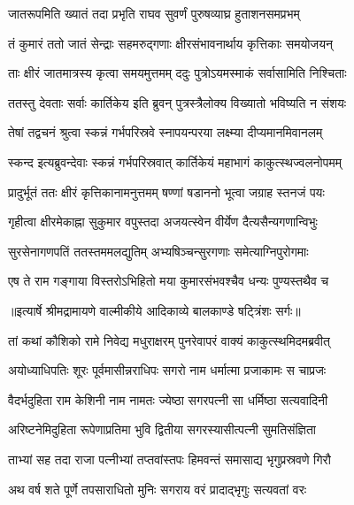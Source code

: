 \twolineshloka
{जातरूपमिति ख्यातं तदा प्रभृति राघव}
{सुवर्णं पुरुषव्याघ्र हुताशनसमप्रभम्} %

\twolineshloka
{तं कुमारं ततो जातं सेन्द्राः सहमरुद्गणाः}
{क्षीरसंभावनार्थाय कृत्तिकाः समयोजयन्} %

\twolineshloka
{ताः क्षीरं जातमात्रस्य कृत्वा समयमुत्तमम्}
{ददुः पुत्रोऽयमस्माकं सर्वासामिति निश्चिताः} %

\twolineshloka
{ततस्तु देवताः सर्वाः कार्तिकेय इति ब्रुवन्}
{पुत्रस्त्रैलोक्य विख्यातो भविष्यति न संशयः} %

\twolineshloka
{तेषां तद्वचनं श्रुत्वा स्कन्नं गर्भपरिस्रवे}
{स्नापयन्परया लक्ष्म्या दीप्यमानमिवानलम्} %

\twolineshloka
{स्कन्द इत्यब्रुवन्देवाः स्कन्नं गर्भपरिस्रवात्}
{कार्तिकेयं महाभागं काकुत्स्थज्वलनोपमम्} %

\twolineshloka
{प्रादुर्भूतं ततः क्षीरं कृत्तिकानामनुत्तमम्}
{षण्णां षडाननो भूत्वा जग्राह स्तनजं पयः} %

\twolineshloka
{गृहीत्वा क्षीरमेकाह्ना सुकुमार वपुस्तदा}
{अजयत्स्वेन वीर्येण दैत्यसैन्यगणान्विभुः} %

\twolineshloka
{सुरसेनागणपतिं ततस्तममलद्युतिम्}
{अभ्यषिञ्चन्सुरगणाः समेत्याग्निपुरोगमाः} %

\twolineshloka
{एष ते राम गङ्गाया विस्तरोऽभिहितो मया}
{कुमारसंभवश्चैव धन्यः पुण्यस्तथैव च} %


{॥इत्यार्षे श्रीमद्रामायणे वाल्मीकीये आदिकाव्ये बालकाण्डे षट्त्रिंशः सर्गः॥}


\twolineshloka
{तां कथां कौशिको रामे निवेद्य मधुराक्षरम्}
{पुनरेवापरं वाक्यं काकुत्स्थमिदमब्रवीत्} %

\twolineshloka
{अयोध्याधिपतिः शूरः पूर्वमासीन्नराधिपः}
{सगरो नाम धर्मात्मा प्रजाकामः स चाप्रजः} %

\twolineshloka
{वैदर्भदुहिता राम केशिनी नाम नामतः}
{ज्येष्ठा सगरपत्नी सा धर्मिष्ठा सत्यवादिनी} %

\twolineshloka
{अरिष्टनेमिदुहिता रूपेणाप्रतिमा भुवि}
{द्वितीया सगरस्यासीत्पत्नी सुमतिसंज्ञिता} %

\twolineshloka
{ताभ्यां सह तदा राजा पत्नीभ्यां तप्तवांस्तपः}
{हिमवन्तं समासाद्य भृगुप्रस्रवणे गिरौ} %

\twolineshloka
{अथ वर्ष शते पूर्णे तपसाराधितो मुनिः}
{सगराय वरं प्रादाद्भृगुः सत्यवतां वरः} %

